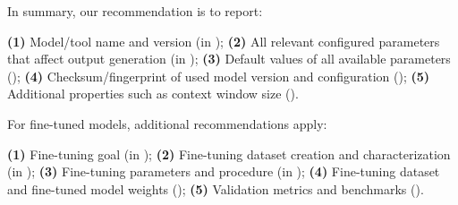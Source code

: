 In summary, our recommendation is to report:

\textbf{(1)} Model/tool name and version (\must in \paper);
\textbf{(2)} All relevant configured parameters that affect output generation (\must in \paper);
\textbf{(3)} Default values of all available parameters (\should);
\textbf{(4)} Checksum/fingerprint of used model version and configuration (\may);
\textbf{(5)} Additional properties such as context window size (\may).

For fine-tuned models, additional recommendations apply:

\textbf{(1)} Fine-tuning goal (\must in \paper);
\textbf{(2)} Fine-tuning dataset creation and characterization (\must in \paper);
\textbf{(3)} Fine-tuning parameters and procedure (\must in \paper);
\textbf{(4)} Fine-tuning dataset and fine-tuned model weights (\should);
\textbf{(5)} Validation metrics and benchmarks (\should).
